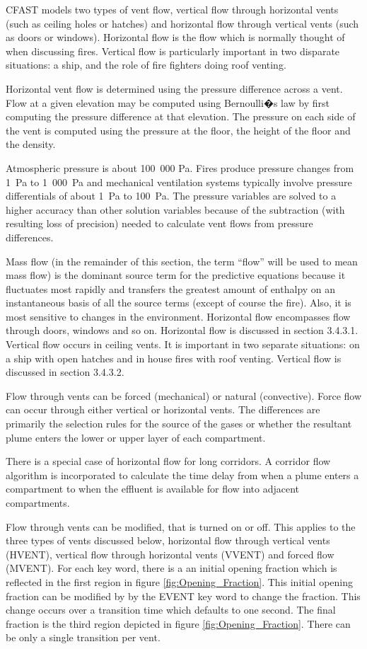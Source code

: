 CFAST models two types of vent flow, vertical flow through horizontal vents (such as ceiling holes or hatches) and horizontal flow through vertical vents (such as doors or windows).  Horizontal flow is the flow which is normally thought of when discussing fires.  Vertical flow is particularly important in two disparate situations: a ship, and the role of fire fighters doing roof venting.

Horizontal vent flow is determined using the pressure difference across a vent.  Flow at a given elevation may be computed using Bernoulli�s law by first computing the pressure difference at that elevation.  The pressure on each side of the vent is computed using the pressure at the floor, the height of the floor and the density.

Atmospheric pressure is about 100~000 Pa. Fires produce pressure changes from 1~Pa to 1~000~Pa and mechanical ventilation systems typically involve pressure differentials of about 1~Pa to 100~Pa.  The pressure variables are solved to a higher accuracy than other solution variables because of the subtraction (with resulting loss of precision) needed to calculate vent flows from pressure differences.

Mass flow (in the remainder of this section, the term ``flow'' will be used to mean mass flow) is the dominant source term for the predictive equations because it fluctuates most rapidly and transfers the greatest amount of enthalpy on an instantaneous basis of all the source terms (except of course the fire).  Also, it is most sensitive to changes in the environment.  Horizontal flow encompasses flow through doors, windows and so on. Horizontal flow is discussed in section 3.4.3.1. Vertical flow occurs in ceiling vents.  It is important in two separate situations: on a ship with open hatches and in house fires with roof venting.  Vertical flow is discussed in section 3.4.3.2.

Flow through vents can be forced (mechanical) or natural (convective). Force flow can occur through either vertical or horizontal vents. The differences are primarily the selection rules for the source of the gases or whether the resultant plume enters the lower or upper layer of each compartment.

There is a special case of horizontal flow for long corridors. A corridor flow algorithm is incorporated to calculate the time delay from when a plume enters a compartment to when the effluent is available for flow into adjacent compartments.

Flow through vents can be modified, that is turned on or off. This applies to the three types of vents discussed below, horizontal flow through vertical vents (HVENT), vertical flow through horizontal vents (VVENT) and forced flow (MVENT). For each key word, there is a an initial opening fraction which is reflected in the first region in figure \ref{fig:Opening_Fraction}. This initial opening fraction can be modified by by the EVENT key word to change the fraction. This change occurs over a transition time which defaults to one second. The final fraction is the third region depicted in figure \ref{fig:Opening_Fraction}. There can be only a single transition per vent.

